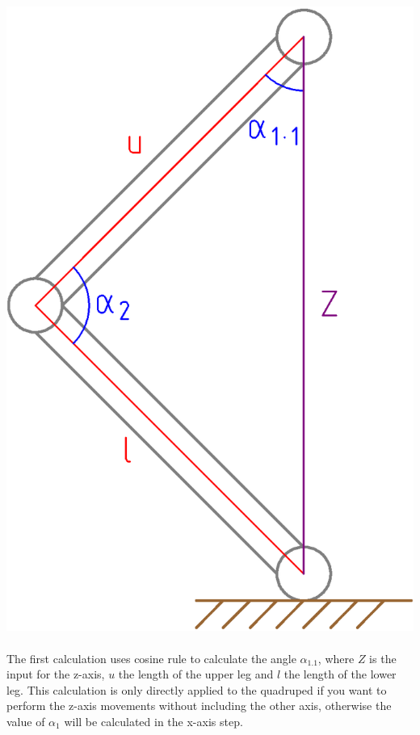\documentclass{article}
\begin{document}
    \paragraph{}
    \includegraphics[scale=0.2]{z-axis}

    \paragraph{}
    The first calculation uses cosine rule to calculate the angle $\alpha_{1.1}$, where $Z$ is the input for the z-axis, $u$ the length of the upper leg and $l$ the length of the lower leg. This calculation is only directly applied to the quadruped if you want to perform the z-axis movements without including the other axis, otherwise the value of $\alpha_1$ will be calculated in the x-axis step.
\end{document}

